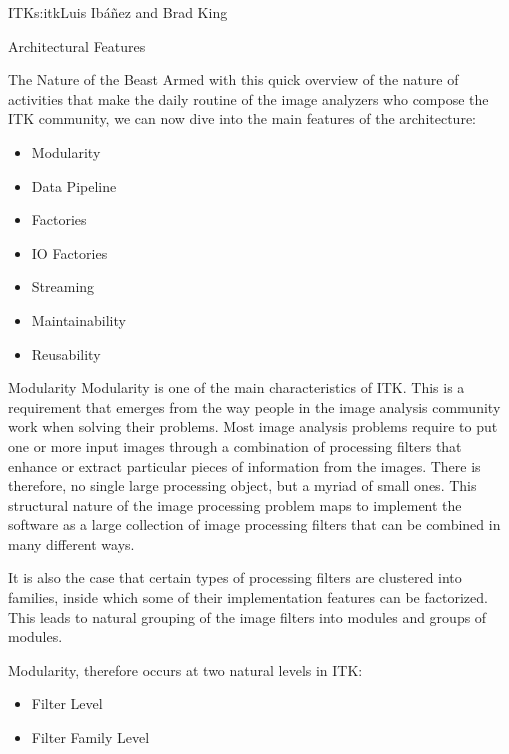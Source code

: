\begin{aosachapter}{ITK}{s:itk}{Luis Ib\'{a}\~{n}ez and Brad King}
\begin{aosasect1}{Architectural Features}
\begin{aosasect2}{The Nature of the Beast}
Armed with this quick overview of the nature of activities that make the daily
routine of the image analyzers who compose the ITK community, we can now dive
into the main features of the architecture:

\begin{itemize}
\item Modularity
\item Data Pipeline
\item Factories
\item IO Factories
\item Streaming
\item Maintainability
\item Reusability
\end{itemize}

\end{aosasect2}

\begin{aosasect2}{Modularity}
Modularity is one of the main characteristics of ITK. This is a requirement
that emerges from the way people in the image analysis community work when
solving their problems. Most image analysis problems require to put one or more
input images through a combination of processing filters that enhance or
extract particular pieces of information from the images. There is therefore,
no single large processing object, but a myriad of small ones. This structural
nature of the image processing problem maps to implement the software as a
large collection of image processing filters that can be combined in many
different ways.

It is also the case that certain types of processing filters are clustered into
families, inside which some of their implementation features can be factorized.
This leads to natural grouping of the image filters into modules and groups of
modules.

Modularity, therefore occurs at two natural levels in ITK:

\begin{itemize}
\item Filter Level
\item Filter Family Level
\end{itemize}


\end{aosasect2}
\end{aosasect1}
\end{aosachapter}
